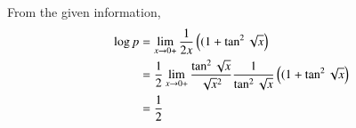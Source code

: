 From the given information,
%
\begin{align}
\log p &= \lim _{x\rightarrow 0+ }\frac{1}{2x}\left((1+\tan^{2}{\sqrt{x}}\right) \\
 &= \frac{1}{2}\lim _{x\rightarrow 0+ }\frac{\tan^{2}{\sqrt{x}}}{\sqrt{x}^2}\frac{1}{\tan^{2}{\sqrt{x}}}\left((1+\tan^{2}{\sqrt{x}}\right)
 \\
 &= \frac{1}{2}
\end{align}
%

